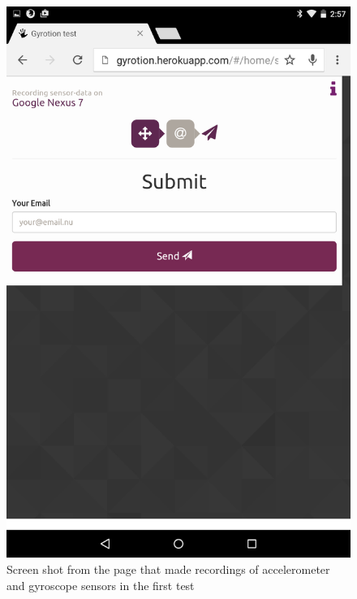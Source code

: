 \begin{figure}[H]
  \begin{minipage}[c]{.23\textwidth}
    \centering
    \includegraphics[scale=0.1]{img/Nexus-submit}
  \end{minipage}
  \caption{Screen shot from the page that  made recordings of accelerometer and gyroscope sensors in the first test}
  \label{fig:gyrotion}
\end{figure}

